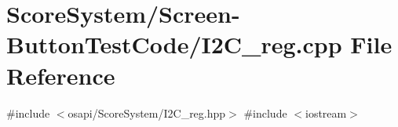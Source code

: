 \hypertarget{_screen-_button_test_code_2_i2_c__reg_8cpp}{}\section{Score\+System/\+Screen-\/\+Button\+Test\+Code/\+I2\+C\+\_\+reg.cpp File Reference}
\label{_screen-_button_test_code_2_i2_c__reg_8cpp}
{\ttfamily \#include $<$osapi/\+Score\+System/\+I2\+C\+\_\+reg.\+hpp$>$}\newline
{\ttfamily \#include $<$iostream$>$}\newline
